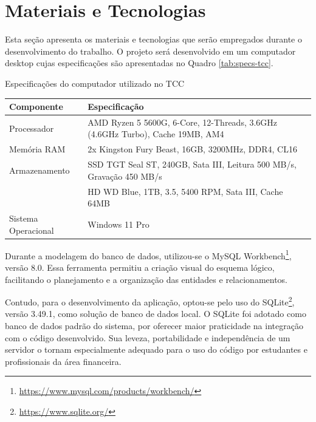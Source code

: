 \section{Materiais e Tecnologias} \label{subsec:material}

Esta seção apresenta os materiais e tecnologias que serão empregados durante o desenvolvimento do trabalho.  
O projeto será desenvolvido em um computador desktop cujas especificações são apresentadas no Quadro \ref{tab:specs-tcc}.  


\begin{board}[!htb]  \centering
	\caption{Especificações do computador utilizado no TCC}
	\label{tab:specs-tcc}
	\begin{varwidth}{\linewidth}
		\begin{tabular}{|p{4cm}|p{11cm}|} \hline
			\textbf{Componente} & \textbf{Especificação} \\ \hline
			Processador & AMD Ryzen 5 5600G, 6-Core, 12-Threads, 3.6GHz (4.6GHz Turbo), Cache 19MB, AM4 \\ \hline  
			Memória RAM & 2x Kingston Fury Beast, 16GB, 3200MHz, DDR4, CL16 \\ \hline  
			Armazenamento & SSD TGT Seal ST, 240GB, Sata III, Leitura 500 MB/s, Gravação 450 MB/s \\  
			& HD WD Blue, 1TB, 3.5, 5400 RPM, Sata III, Cache 64MB \\ \hline  
			Sistema Operacional & Windows 11 Pro \\ \hline
		\end{tabular}
	\end{varwidth}
\end{board}

Durante a modelagem do banco de dados, utilizou-se o MySQL Workbench\footnote{\url{https://www.mysql.com/products/workbench/}}, versão 8.0. Essa ferramenta permitiu a criação visual do esquema lógico, facilitando o planejamento e a organização das entidades e relacionamentos.

Contudo, para o desenvolvimento da aplicação, optou-se pelo uso do SQLite\footnote{\url{https://www.sqlite.org/}}, versão 3.49.1, como solução de banco de dados local. O SQLite foi adotado como banco de dados padrão do sistema, por oferecer maior praticidade na integração com o código desenvolvido. Sua leveza, portabilidade e independência de um servidor o tornam especialmente adequado para o uso do código por estudantes e profissionais da área financeira.

